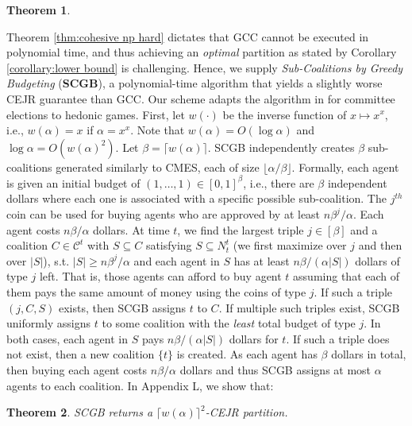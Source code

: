\documentclass[letterpaper]{article}
\newtheorem{theorem}{Theorem}
\begin{document}
\begin{theorem}
\end{theorem}  Theorem \ref{thm:cohesive np hard} dictates that GCC cannot be executed in polynomial time, and thus achieving an \textit{optimal} partition as stated by Corollary \ref{corollary:lower bound} is challenging. Hence, we supply \textit{Sub-Coalitions by Greedy Budgeting} (\textbf{SCGB}), a polynomial-time algorithm that yields a slightly worse CEJR guarantee than GCC. Our scheme adapts the algorithm in \cite[Section 5.3]{do2022online} for committee elections to hedonic games. First, let $w(\cdot)$ be the inverse function of $x \mapsto x^x$, i.e., $w(\alpha) = x$ if $\alpha = x^x$. Note that $w(\alpha) = O(\log \alpha)$ and $\log \alpha = O(w(\alpha)^2)$. Let $\beta = \lceil w(\alpha) \rceil$. SCGB independently creates $\beta$ sub-coalitions generated similarly to CMES, each of size $\lfloor \alpha/\beta \rfloor$. Formally, each agent is given an initial budget of $(1, \dots, 1) \in [0,1]^\beta$, i.e., there are $\beta$ independent dollars where each one is associated with a specific possible sub-coalition. The $j^{th}$ coin can be used for buying agents who are approved by at least $n \beta^j /\alpha$. Each agent costs $n \beta/\alpha$ dollars. At time $t$, we find the largest triple $j \in [\beta]$ and a coalition $C \in \mathcal{C}^t$ with $S \subseteq C$ satisfying $S \subseteq N_t^t$ (we first maximize over $j$ and then over $|S|$), s.t. $|S| \geq n \beta^j /\alpha$ and each agent in $S$ has at least $n\beta /(\alpha |S|)$ dollars of type $j$ left. That is, those agents can afford to buy agent $t$ assuming that each of them pays the same amount of money using the coins of type $j$. If such a triple $(j,C,S)$ exists, then SCGB assigns $t$ to $C$. If multiple such triples exist, SCGB uniformly assigns $t$ to some coalition with the \textit{least} total budget of type $j$. In both cases, each agent in $S$ pays $n\beta /(\alpha |S|)$ dollars for $t$. If such a triple does not exist, then a new coalition $\{t\}$ is created. As each agent has $\beta$ dollars in total, then buying each agent costs $n \beta/\alpha$ dollars and thus SCGB assigns at most $\alpha$ agents to each coalition. In Appendix L, we show that:  \begin{theorem}
\label{thm:scgb}
SCGB returns a $\lceil w(\alpha) \rceil^2$-CEJR partition.
\end{theorem}
\end{document}
